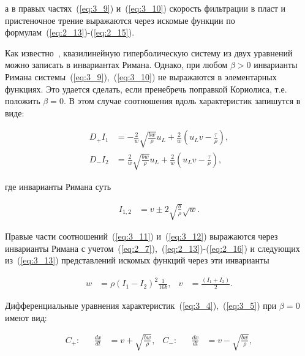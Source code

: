 а в правых частях~(\ref{eq:3_9}) и~(\ref{eq:3_10}) скорость фильтрации в пласт и пристеночное трение выражаются через искомые функции по формулам~(\ref{eq:2_13})-(\ref{eq:2_15}).



Как известно~\cite{rozhd1}, квазилинейную гиперболическую систему из двух уравнений можно записать в инвариантах Римана. Однако, при любом $\beta >0$ инварианты Римана системы~(\ref{eq:3_9}),~(\ref{eq:3_10}) не выражаются в элементарных функциях. Это удается сделать, если пренебречь поправкой Кориолиса, т.е. положить $\beta = 0$. В этом случае соотношения вдоль характеристик запишутся в виде:

\begin{align}

 D_+I_1&= -\frac{2}{w} \sqrt{\frac{bw}{\rho}} u_L + \frac{2}{w} \left(u_L v - \frac{\tau}{\rho}\right), \label{eq:3_11} \\

 D_-I_2&= \frac{2}{w} \sqrt{\frac{bw}{\rho}} u_L + \frac{2}{w} \left(u_L v - \frac{\tau}{\rho}\right), \label{eq:3_12}

\end{align}

где инварианты Римана суть

\begin{align}

 I_{1,2}&= v \pm 2 \sqrt{\frac{b}{\rho}}\sqrt{w}. \label{eq:3_13}

\end{align}



Правые части соотношений~(\ref{eq:3_11}) и~(\ref{eq:3_12}) выражаются через инварианты Римана с учетом~(\ref{eq:2_7}),~(\ref{eq:2_13})-(\ref{eq:2_16}) и следующих из~(\ref{eq:3_13}) представлений искомых функций через эти инварианты

\begin{align}

w & = \rho \left(I_1 - I_2\right)^2 \frac{1}{16b}, & v& = \frac{\left(I_1+I_2\right)}{2}. \nonumber

\end{align}



Дифференциальные уравнения характеристик~(\ref{eq:3_4}),~(\ref{eq:3_5}) при $\beta = 0$ имеют вид:

\begin{align}

C_+:& & \frac{dx}{dt} & = v + \sqrt{\frac{bw}{\rho}}, & C_-:& & \frac{dx}{dt} & = v - \sqrt{\frac{bw}{\rho}}, \label{eq:3_14}

\end{align}

